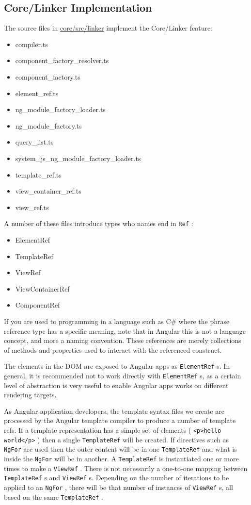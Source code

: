 \subsection{Core/Linker Implementation}

The source files in
\url{core/src/linker}
implement the Core/Linker feature:

\begin{itemize}
  \item compiler.ts
  \item component\_factory\_resolver.ts
  \item component\_factory.ts
  \item element\_ref.ts
  \item ng\_module\_factory\_loader.ts
  \item ng\_module\_factory.ts
  \item query\_list.ts
  \item system\_js\_ng\_module\_factory\_loader.ts
  \item template\_ref.ts
  \item view\_container\_ref.ts
  \item view\_ref.ts
\end{itemize}

A number of these files introduce types who names end in
\texttt{Ref}
:

\begin{itemize}
  \item ElementRef
  \item TemplateRef
  \item ViewRef
  \item ViewContainerRef
  \item ComponentRef
\end{itemize}

If you are used to programming in a language such as C\# where the phrase reference
type has a specific meaning, note that in Angular this is not a language concept, and
more a naming convention. These references are merely collections of methods and
properties used to interact with the referenced construct.

The elements in the DOM are exposed to Angular apps as
\texttt{ElementRef}
s. In general, it
is recommended not to work directly with
\texttt{ElementRef}
s, as a certain level of
abstraction is very useful to enable Angular apps works on different rendering targets.

As Angular application developers, the template syntax files we create are processed
by the Angular template compiler to produce a number of template refs. If a template
representation has a simple set of elements (
\texttt{<p>hello world</p>}
) then a single
\texttt{TemplateRef}
will be created. If directives such as
\texttt{NgFor}
are used then the outer
content will be in one
\texttt{TemplateRef}
and what is inside the
\texttt{NgFor}
will be in another. A
\texttt{TemplateRef}
is instantiated one or more times to make a
\texttt{ViewRef}
. There is not
necessarily a one-to-one mapping between
\texttt{TemplateRef}
s and
\texttt{ViewRef}
s. Depending
on the number of iterations to be applied to an
\texttt{NgFor}
,  there will be that number of
instances of
\texttt{ViewRef}
s, all based on the same
\texttt{TemplateRef}
.


